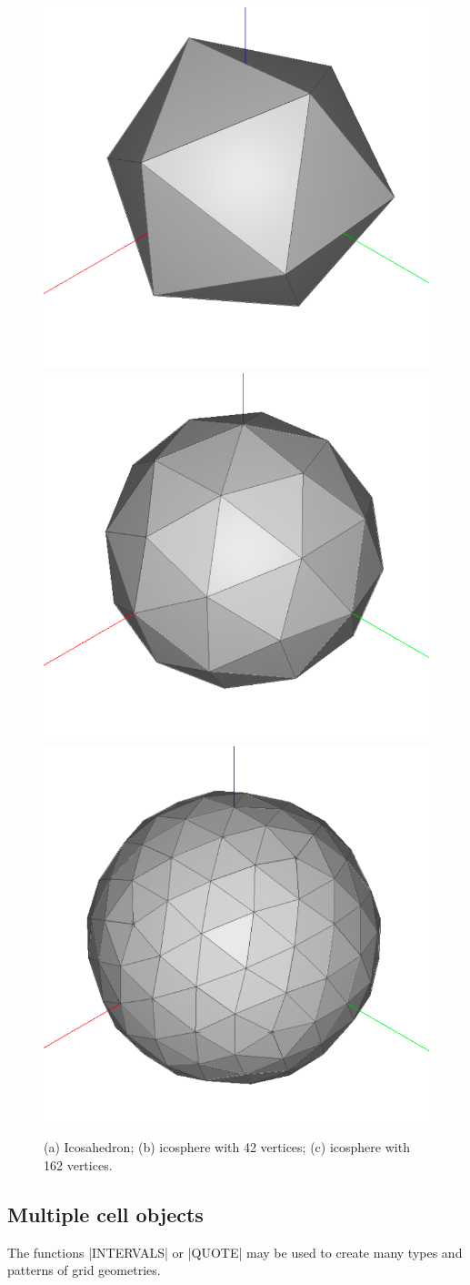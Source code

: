 \begin{figure}[htbp] %
 \includegraphics[width=0.34\linewidth]{chapter-05/figs/icosphere0}%
 \includegraphics[width=0.33\linewidth]{chapter-05/figs/icosphere1}%
 \includegraphics[width=0.325\linewidth]{chapter-05/figs/icosphere2}%
\hfill
\caption{(a) Icosahedron; (b) icosphere with 42 vertices; (c)  icosphere with 162 vertices. }
\label{5:icospheres}
\end{figure}



\subsection*{Multiple cell objects}\label{sect:5-1-1}


The functions |INTERVALS| or |QUOTE| may be used to create many types and patterns of grid geometries.

